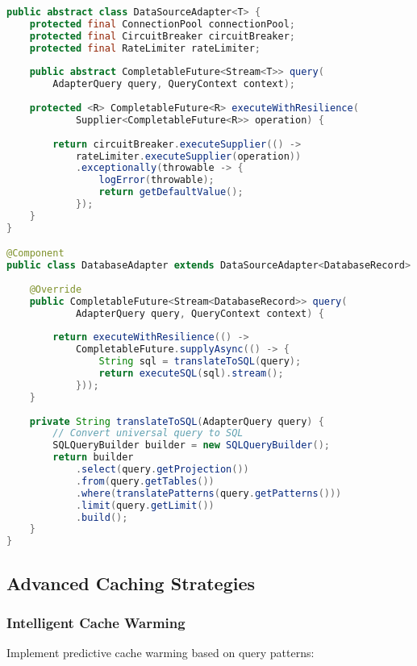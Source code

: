 \documentclass[11pt,a4paper]{article}
\begin{document}
\begin{lstlisting}[language=Java, caption=Universal Data Source Adapter]
public abstract class DataSourceAdapter<T> {
    protected final ConnectionPool connectionPool;
    protected final CircuitBreaker circuitBreaker;
    protected final RateLimiter rateLimiter;
    
    public abstract CompletableFuture<Stream<T>> query(
        AdapterQuery query, QueryContext context);
    
    protected <R> CompletableFuture<R> executeWithResilience(
            Supplier<CompletableFuture<R>> operation) {
        
        return circuitBreaker.executeSupplier(() ->
            rateLimiter.executeSupplier(operation))
            .exceptionally(throwable -> {
                logError(throwable);
                return getDefaultValue();
            });
    }
}

@Component
public class DatabaseAdapter extends DataSourceAdapter<DatabaseRecord> {
    
    @Override
    public CompletableFuture<Stream<DatabaseRecord>> query(
            AdapterQuery query, QueryContext context) {
        
        return executeWithResilience(() ->
            CompletableFuture.supplyAsync(() -> {
                String sql = translateToSQL(query);
                return executeSQL(sql).stream();
            }));
    }
    
    private String translateToSQL(AdapterQuery query) {
        // Convert universal query to SQL
        SQLQueryBuilder builder = new SQLQueryBuilder();
        return builder
            .select(query.getProjection())
            .from(query.getTables())
            .where(translatePatterns(query.getPatterns()))
            .limit(query.getLimit())
            .build();
    }
}
\end{lstlisting}

\subsection{Advanced Caching Strategies}

\subsubsection{Intelligent Cache Warming}

Implement predictive cache warming based on query patterns:
\end{document}
